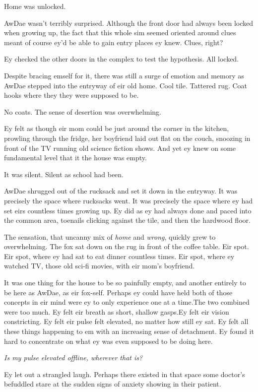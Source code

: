 Home was unlocked.

AwDae wasn't terribly surprised. Although the front door had always been locked when growing up, the fact that this whole sim seemed oriented around clues meant of course ey'd be able to gain entry places ey knew. Clues, right?

Ey checked the other doors in the complex to test the hypothesis. All locked.

Despite bracing emself for it, there was still a surge of emotion and memory as AwDae stepped into the entryway of eir old home. Cool tile. Tattered rug. Coat hooks where they they were supposed to be.

No coats. The sense of desertion was overwhelming.

Ey felt as though eir mom could be just around the corner in the kitchen, prowling through the fridge, her boyfriend laid out flat on the couch, snoozing in front of the TV running old science fiction shows. And yet ey knew on some fundamental level that it the house was empty.

It was silent. Silent as school had been.

AwDae shrugged out of the rucksack and set it down in the entryway. It was precisely the space where rucksacks went. It was precisely the space where ey had set eirs countless times growing up. Ey did as ey had always done and paced into the common area, toenails clicking against the tile, and then the hardwood floor.

The sensation, that uncanny mix of \emph{home} and \emph{wrong}, quickly grew to overwhelming. The fox sat down on the rug in front of the coffee table. Eir spot. Eir spot, where ey had sat to eat dinner countless times. Eir spot, where ey watched TV, those old sci-fi movies, with eir mom's boyfriend.

It was one thing for the house to be so painfully empty, and another entirely to be here as AwDae, as eir fox-self. Perhaps ey could have held both of those concepts in eir mind were ey to only experience one at a time.The two combined were too much. Ey felt eir breath as short, shallow gasps.Ey felt eir vision constricting. Ey felt eir pulse felt elevated, no matter how still ey sat. Ey felt all these things happening to em with an increasing sense of detachment. Ey found it hard to concentrate on what ey was even supposed to be doing here.

\emph{Is my pulse elevated offline, wherever that is?}

Ey let out a strangled laugh. Perhaps there existed in that space some doctor's befuddled stare at the sudden signs of anxiety showing in their patient.

